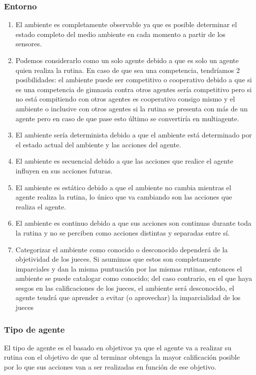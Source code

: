 \documentclass{article}
\begin{document}
            \subsubsection{Entorno}
                \begin{enumerate}
                    \item El ambiente es completamente observable ya que es posible determinar el estado completo del medio ambiente en cada momento a partir de los sensores.
                    \item Podemos considerarlo como un solo agente debido a que es solo un agente quien realiza la rutina. En caso de que sea una competencia, tendríamos 2 posibilidades: el ambiente puede ser competitivo o cooperativo debido a que si es una competencia de gimnasia contra otros agentes sería competitivo pero si no está compitiendo con otros agentes es cooperativo consigo mismo y el ambiente o inclusive con otros agentes si la rutina se presenta con más de un agente pero en caso de que pase esto último se convertiría en multiagente.
                    \item El ambiente sería determinista debido a que el ambiente está determinado por el estado actual del ambiente y las acciones del agente.
                    \item El ambiente es secuencial debido a que las acciones que realice el agente influyen en sus acciones futuras.
                    \item El ambiente es estático debido a que el ambiente no cambia mientras el agente realiza la rutina, lo único que va cambiando son las acciones que realiza el agente.
                    \item El ambiente es continuo debido a que sus acciones son continuas durante toda la rutina y no se perciben como acciones distintas y separadas entre sí.
                    \item Categorizar el ambiente como conocido o desconocido dependerá de la objetividad de los jueces. Si asumimos que estos son completamente imparciales y dan la misma puntuación por las mismas rutinas, entonces el ambiente se puede catalogar como conocido; del caso contrario, en el que haya sesgos en las calificaciones de los jueces, el ambiente será desconocido, el agente tendrá que aprender a evitar (o aprovechar) la imparcialidad de los jueces
                \end{enumerate}

            \subsubsection{Tipo de agente}
                El tipo de agente es el basado en objetivos ya que el agente va a realizar su rutina con el objetivo de que al terminar obtenga la mayor calificación posible por lo que sus acciones van a ser realizadas en función de ese objetivo.
                
\end{document}
